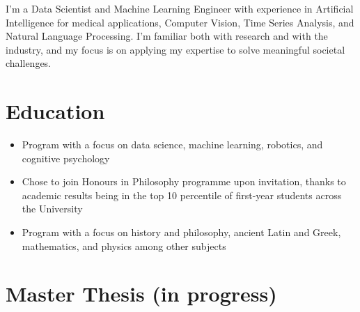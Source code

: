 \documentclass[11pt,a4paper,sans]{moderncv}        %
\begin{document}
\makecvtitle

I'm a Data Scientist and Machine Learning Engineer with experience in Artificial Intelligence for medical applications, Computer Vision, Time Series Analysis, and Natural Language Processing. I'm familiar both with research and with the industry, and my focus is on applying my expertise to solve meaningful societal challenges.

\section{Education}
{%
}
\vskip 0.1in
{\begin{itemize}
    \item Program with a focus on data science, machine learning, robotics, and cognitive psychology
    \item Chose to join Honours in Philosophy programme upon invitation, thanks to academic results being in the top 10 percentile of first-year students across the University
\end{itemize}}
\vskip 0.1in
{\begin{itemize}
    \item Program with a focus on history and philosophy, ancient Latin and Greek, mathematics, and physics among other subjects
\end{itemize}}

\vskip 0.25in

\section{Master Thesis (in progress)}
\end{document}
